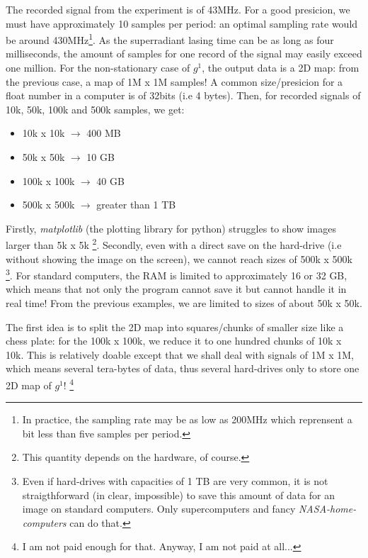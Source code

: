 \documentclass[12pt]{report}
\begin{document}
The recorded signal from the experiment is of 43MHz. For a good presicion, we must have approximately 10 samples per period: an optimal sampling rate would be around 430MHz\footnote{In practice, the sampling rate may be as low as 200MHz which reprensent a bit less than five samples per period.}. As the superradiant lasing time can be as long as four milliseconds, the amount of samples for one record of the signal may easily exceed one million. For the non-stationary case of $g^1$, the output data is a 2D map: from the previous case, a map of 1M x 1M samples! A common size/presicion for a float number in a computer is of 32bits (i.e 4 bytes). Then, for recorded signals of 10k, 50k, 100k and 500k samples, we get:
\begin{itemize}
	\item 10k x 10k $\rightarrow$ 400 MB
	\item 50k x 50k $\rightarrow$ 10 GB
	\item 100k x 100k $\rightarrow$ 40 GB
	\item 500k x 500k $\rightarrow$ greater than 1 TB
\end{itemize}
Firstly, \textit{matplotlib} (the plotting library for python) struggles to show images larger than 5k x 5k \footnote{This quantity depends on the hardware, of course.}. Secondly, even with a direct save on the hard-drive (i.e without showing the image on the screen), we cannot reach sizes of 500k x 500k \footnote{Even if hard-drives with capacities of 1 TB are very common, it is not straigthforward (in clear, impossible) to save this amount of data for an image on standard computers. Only supercomputers and fancy \textit{NASA-home-computers} can do that.}. For standard computers, the RAM is limited to approximately 16 or 32 GB, which means that not only the program cannot save it but cannot handle it in real time! From the previous examples, we are limited to sizes of about 50k x 50k.

The first idea is to split the 2D map into squares/chunks of smaller size like a chess plate: for the 100k x 100k, we reduce it to one hundred chunks of 10k x 10k. This is relatively doable except that we shall deal with signals of 1M x 1M, which means several tera-bytes of data, thus several hard-drives only to store one 2D map of $g^1$! \footnote{I am not paid enough for that. Anyway, I am not paid at all...}
\end{document}

